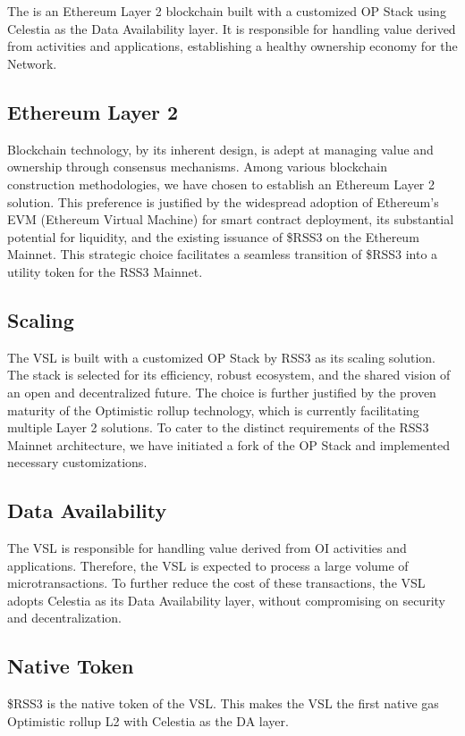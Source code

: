 \section{}
\label{sec:VSL}

The  is an Ethereum Layer 2 blockchain built with a customized OP Stack using Celestia as the Data Availability layer.
It is responsible for handling value derived from  activities and applications, establishing a healthy ownership economy for the Network.

\subsection{Ethereum Layer 2}

Blockchain technology, by its inherent design, is adept at managing value and ownership through consensus mechanisms.
Among various blockchain construction methodologies, we have chosen to establish an Ethereum Layer 2 solution.
This preference is justified by the widespread adoption of Ethereum's EVM (Ethereum Virtual Machine) for smart contract deployment, its substantial potential for liquidity, and the existing issuance of \$RSS3 on the Ethereum Mainnet. 
This strategic choice facilitates a seamless transition of \$RSS3 into a utility token for the RSS3 Mainnet.

\subsection{Scaling}
The \gls{VSL} is built with a customized OP Stack by RSS3 as its scaling solution.
The stack is selected for its efficiency, robust ecosystem, and the shared vision of an open and decentralized future.
The choice is further justified by the proven maturity of the Optimistic rollup technology, which is currently facilitating multiple Layer 2 solutions.
To cater to the distinct requirements of the RSS3 Mainnet architecture, we have initiated a fork of the OP Stack and implemented necessary customizations.

\subsection{Data Availability}

The \gls{VSL} is responsible for handling value derived from \gls{OI} activities and applications.
Therefore, the \gls{VSL} is expected to process a large volume of microtransactions.
To further reduce the cost of these transactions, the \gls{VSL} adopts Celestia as its Data Availability layer, without compromising on security and decentralization.

\subsection{Native Token}

\$RSS3 is the native token of the \gls{VSL}.
This makes the \gls{VSL} the first native gas Optimistic rollup L2 with Celestia as the DA layer.